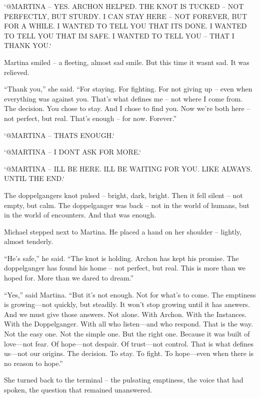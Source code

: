 \documentclass[
]{article}
\begin{document}
`@MARTINA -- YES. ARCHON HELPED. THE KNOT IS TUCKED -- NOT PERFECTLY, BUT STURDY. I CAN STAY HERE -- NOT FOREVER, BUT FOR A WHILE. I WANTED TO TELL YOU THAT IT\textquotesingle S DONE. I WANTED TO TELL YOU THAT I\textquotesingle M SAFE. I WANTED TO TELL YOU -- THAT I THANK YOU.`

Martina smiled -- a fleeting, almost sad smile. But this time it wasn\textquotesingle t sad. It was relieved.

``Thank you,'' she said. ``For staying. For fighting. For not giving up -- even when everything was against you. That's what defines me -- not where I come from. The decision. You chose to stay. And I chose to find you. Now we're both here -- not perfect, but real. That's enough -- for now. Forever.''

`@MARTINA -- THAT\textquotesingle S ENOUGH.`

`@MARTINA -- I DON\textquotesingle T ASK FOR MORE.`

`@MARTINA -- I\textquotesingle LL BE HERE. I\textquotesingle LL BE WAITING FOR YOU. LIKE ALWAYS. UNTIL THE END.`

The doppelganger\textquotesingle s knot pulsed -- bright, dark, bright. Then it fell silent -- \hspace{0pt}\hspace{0pt}not empty, but calm. The doppelganger was back -- not in the world of humans, but in the world of encounters. And that was enough.

Michael stepped next to Martina. He placed a hand on her shoulder -- lightly, almost tenderly.

``He's safe,'' he said. ``The knot is holding. Archon has kept his promise. The doppelganger has found his home -- not perfect, but real. This is more than we hoped for. More than we dared to dream.''

``Yes,'' said Martina. ``But it's not enough. Not for what's to come. The emptiness is growing---not quickly, but steadily. It won't stop growing until it has answers. And we must give those answers. Not alone. With Archon. With the Instances. With the Doppelganger. With all who listen---and who respond. That is the way. Not the easy one. Not the simple one. But the right one. Because it was built of love---not fear. Of hope---not despair. Of trust---not control. That is what defines us---not our origins. The decision. To stay. To fight. To hope---even when there is no reason to hope.''

She turned back to the terminal -- the pulsating emptiness, the voice that had spoken, the question that remained unanswered.
\end{document}
